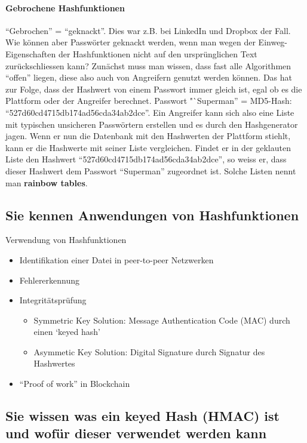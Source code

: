 \documentclass[10pt,a4paper]{article}
\begin{document}
\paragraph*{Gebrochene Hashfunktionen}"`Gebrochen"' = "`geknackt"'. Dies war z.B. bei LinkedIn und Dropbox der Fall. Wie können aber Passwörter geknackt werden, wenn man wegen der Einweg-Eigenschaften der Hashfunktionen nicht auf den ursprünglichen Text zurückschliessen kann?
Zunächst muss man wissen, dass fast alle Algorithmen "`offen"' liegen, diese also auch von Angreifern genutzt werden können. Das hat zur Folge, dass der Hashwert von einem Passwort immer gleich ist, egal ob es die Plattform oder der Angreifer berechnet.
Passwort "`Superman” = MD5-Hash: "`527d60cd4715db174ad56cda34ab2dce"'.
Ein Angreifer kann sich also eine Liste mit typischen unsicheren Passwörtern erstellen und es durch den Hashgenerator jagen. Wenn er nun die Datenbank mit den Hashwerten der Plattform stiehlt, kann er die Hashwerte mit seiner Liste vergleichen. Findet er in der geklauten Liste den Hashwert "`527d60cd4715db174ad56cda34ab2dce"', so weiss er, dass dieser Hashwert dem Passwort "`Superman"' zugeordnet ist. Solche Listen nennt man \textbf{rainbow tables}.

\pagebreak
\subsection*{Sie kennen Anwendungen von Hashfunktionen}
Verwendung von Hashfunktionen
\begin{itemize}[noitemsep,topsep=0pt,leftmargin=*]
    \item Identifikation einer Datei in peer-to-peer Netzwerken
    \item Fehlererkennung
    \item Integritätsprüfung
    \begin{itemize}[noitemsep,topsep=0pt,leftmargin=*]
        \item Symmetric Key Solution: Message Authentication Code (MAC) durch einen `keyed hash'
        \item Asymmetic Key Solution: Digital Signature durch Signatur des Hashwertes
    \end{itemize}
    \item "`Proof of work"' in Blockchain
\end{itemize}


\subsection*{Sie wissen was ein keyed Hash (HMAC) ist und wofür dieser verwendet werden kann}
\end{document}

